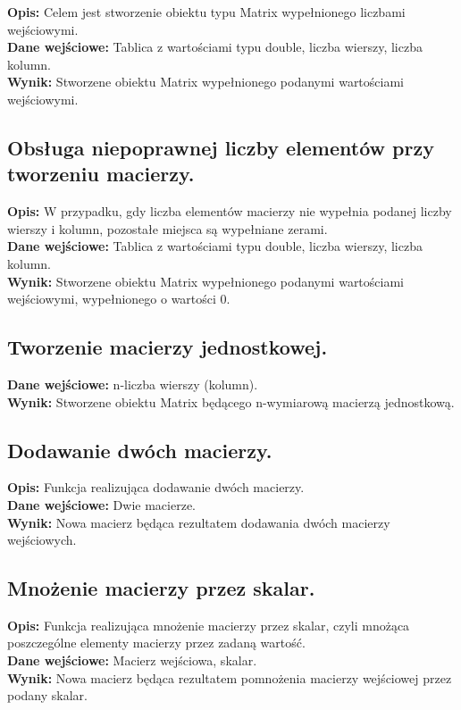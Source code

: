 \documentclass[a4paper,12pt,twoside]{article}
\begin{document}
\textbf{Opis:} Celem jest stworzenie obiektu typu Matrix wypełnionego liczbami wejściowymi.\\
\textbf{Dane wejściowe:} Tablica z wartościami typu double, liczba wierszy, liczba kolumn.\\
\textbf{Wynik:} Stworzene obiektu Matrix wypełnionego podanymi wartościami wejściowymi.

\subsection{Obsługa niepoprawnej liczby elementów przy tworzeniu macierzy.}

\textbf{Opis:} W przypadku, gdy liczba elementów macierzy nie wypełnia podanej liczby wierszy
i kolumn, pozostałe miejsca są wypełniane zerami.\\
\textbf{Dane wejściowe:} Tablica z wartościami typu double, liczba wierszy, liczba kolumn.\\
\textbf{Wynik:} Stworzene obiektu Matrix wypełnionego podanymi wartościami wejściowymi, wypełnionego
o wartości 0.

\subsection{Tworzenie macierzy jednostkowej.}

\textbf{Dane wejściowe:} n-liczba wierszy (kolumn).\\
\textbf{Wynik:} Stworzene obiektu Matrix będącego n-wymiarową macierzą jednostkową.

\subsection{Dodawanie dwóch macierzy.}

\textbf{Opis:} Funkcja realizująca dodawanie dwóch macierzy.\\
\textbf{Dane wejściowe:} Dwie macierze.\\
\textbf{Wynik:} Nowa macierz będąca rezultatem dodawania dwóch macierzy wejściowych.

\subsection{Mnożenie macierzy przez skalar.}

\textbf{Opis:} Funkcja realizująca mnożenie macierzy przez skalar, czyli mnożąca poszczególne
elementy macierzy przez zadaną wartość.\\
\textbf{Dane wejściowe:} Macierz wejściowa, skalar.\\
\textbf{Wynik:} Nowa macierz będąca rezultatem pomnożenia macierzy wejściowej przez podany skalar.
\end{document}
